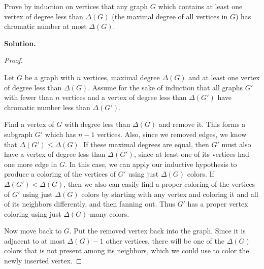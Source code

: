 \documentclass{book}
\begin{document}
\setcounter{project}{46}
\addtocounter{project}{-1}
\begin{activity}[]\label{activity-39}
\hypertarget{p-423}{}%
Prove by induction on vertices that any graph \(G\) which contains at least one vertex of degree less than \(\Delta(G)\) (the maximal degree of all vertices in \(G\)) has chromatic number at most \(\Delta(G)\).%
\par\smallskip%
\noindent\textbf{Solution.}\hypertarget{solution-45}{}\quad%
\begin{proof}\hypertarget{proof-5}{}
\hypertarget{p-424}{}%
Let \(G\) be a graph with \(n\) vertices, maximal degree \(\Delta(G)\) and at least one vertex of degree less than \(\Delta(G)\). Assume for the sake of induction that all graphs \(G'\) with fewer than \(n\) vertices and a vertex of degree less than \(\Delta(G')\) have chromatic number less than \(\Delta(G')\).%
\par
\hypertarget{p-425}{}%
Find a vertex of \(G\) with degree less than \(\Delta(G)\) and remove it. This forms a subgraph \(G'\) which has \(n-1\) vertices. Also, since we removed edges, we know that \(\Delta(G') \le \Delta(G)\). If these maximal degrees are equal, then \(G'\) must also have a vertex of degree less than \(\Delta(G')\), since at least one of its vertices had one more edge in \(G\). In this case, we can apply our inductive hypothesis to produce a coloring of the vertices of \(G'\) using just \(\Delta(G)\) colors. If \(\Delta(G') \lt  \Delta(G)\), then we also can easily find a proper coloring of the vertices of \(G'\) using just \(\Delta(G)\) colors by starting with any vertex and coloring it and all of its neighbors differently, and then fanning out. Thus \(G'\) has a proper vertex coloring using just \(\Delta(G)\)-many colors.%
\par
\hypertarget{p-426}{}%
Now move back to \(G\). Put the removed vertex back into the graph. Since it is adjacent to at most \(\Delta(G) - 1\) other vertices, there will be one of the \(\Delta(G)\) colors that is not present among its neighbors, which we could use to color the newly inserted vertex.%
\end{proof}
\end{activity}
\end{document}
